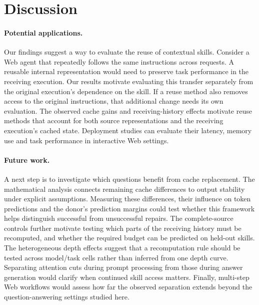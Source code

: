\section{Discussion}
\label{sec:discussion}

\paragraph{Potential applications.}
Our findings suggest a way to evaluate the reuse of contextual skills.
Consider a Web agent that repeatedly follows the same instructions across
requests. A reusable internal representation would need to preserve task
performance in the receiving execution. Our results motivate evaluating
this transfer separately from the original execution's dependence on the
skill. If a reuse method also removes access to the original instructions,
that additional change needs its own evaluation. The observed cache gains and receiving-history effects motivate reuse
methods that account for both source representations and the receiving
execution's cached state. Deployment studies can evaluate their latency, memory
use and task performance in interactive Web settings.

\paragraph{Future work.}
A next step is to investigate which questions benefit from cache
replacement. The mathematical analysis connects remaining cache
differences to output stability under explicit assumptions. Measuring
these differences, their influence on token predictions and the donor's
prediction margins could test whether this framework helps distinguish
successful from unsuccessful repairs. The complete-source controls further motivate testing which parts of
the receiving history must be recomputed, and whether the required budget
can be predicted on held-out skills. The heterogeneous depth effects suggest that a recomputation rule should
be tested across model/task cells rather than inferred from one depth curve. Separating attention cuts during prompt
processing from those during answer generation would clarify when continued
skill access matters. Finally,
multi-step Web workflows would assess how far the observed separation
extends beyond the question-answering settings studied here.
